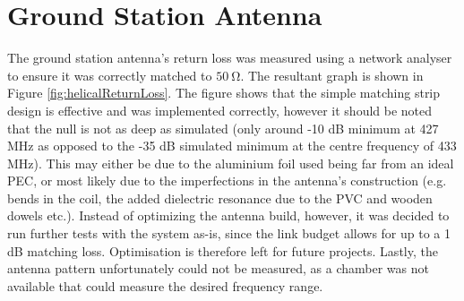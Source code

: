 \graphicspath{{./figures}}

\section{Ground Station Antenna}

The ground station antenna's return loss was measured using a network analyser to ensure it was correctly matched to $\SI{50}{\ohm}$. The resultant graph is shown in Figure \ref{fig:helicalReturnLoss}. The figure shows that the simple matching strip design is effective and was implemented correctly, however it should be noted that the null is not as deep as simulated (only around -10 dB minimum at 427 MHz as opposed to the -35 dB simulated minimum at the centre frequency of 433 MHz). This may either be due to the aluminium foil used being far from an ideal PEC, or most likely due to the imperfections in the antenna's construction (e.g. bends in the coil, the added dielectric resonance due to the PVC and wooden dowels etc.). Instead of optimizing the antenna build, however, it was decided to run further tests with the system as-is, since the link budget allows for up to a 1 dB matching loss. Optimisation is therefore left for future projects. Lastly, the antenna pattern unfortunately could not be measured, as a chamber was not available that could measure the desired frequency range.


